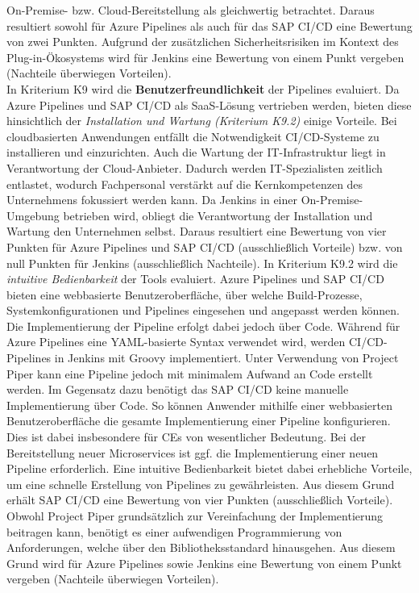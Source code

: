 On-Premise- bzw. Cloud-Bereitstellung als gleichwertig betrachtet. Daraus resultiert sowohl für Azure Pipelines als auch für das SAP CI/CD eine Bewertung von zwei Punkten. Aufgrund der zusätzlichen Sicherheitsrisiken im Kontext des Plug-in-Ökosystems wird für Jenkins eine Bewertung von einem Punkt vergeben (Nachteile überwiegen Vorteilen).\\ In Kriterium K9 wird die \textbf{Benutzerfreundlichkeit} der Pipelines evaluiert. Da Azure Pipelines und SAP CI/CD als SaaS-Lösung vertrieben werden, bieten diese hinsichtlich der \textit{Installation und Wartung (Kriterium K9.2)} einige Vorteile. Bei cloudbasierten Anwendungen entfällt die Notwendigkeit CI/CD-Systeme zu installieren und einzurichten. Auch die Wartung der IT-Infrastruktur liegt in Verantwortung der Cloud-Anbieter. Dadurch werden IT-Spezialisten zeitlich entlastet, wodurch Fachpersonal verstärkt auf die Kernkompetenzen des Unternehmens fokussiert werden kann. Da Jenkins in einer On-Premise-Umgebung betrieben wird, obliegt die Verantwortung der Installation und Wartung den Unternehmen selbst. Daraus resultiert eine Bewertung von vier Punkten für Azure Pipelines und SAP CI/CD (ausschließlich Vorteile) bzw. von null Punkten für Jenkins (ausschließlich Nachteile). In Kriterium K9.2 wird die \textit{intuitive Bedienbarkeit} der Tools evaluiert. Azure Pipelines und SAP CI/CD bieten eine webbasierte Benutzeroberfläche, über welche Build-Prozesse, Systemkonfigurationen und Pipelines eingesehen und angepasst werden können. Die Implementierung der Pipeline erfolgt dabei jedoch über Code. Während für Azure Pipelines eine YAML-basierte Syntax verwendet wird, werden CI/CD-Pipelines in Jenkins mit Groovy implementiert. Unter Verwendung von Project Piper kann eine Pipeline jedoch mit minimalem Aufwand an Code erstellt werden. Im Gegensatz dazu benötigt das SAP CI/CD keine manuelle Implementierung über Code. So können Anwender mithilfe einer webbasierten Benutzeroberfläche die gesamte Implementierung einer Pipeline konfigurieren. Dies ist dabei insbesondere für CEs von wesentlicher Bedeutung. Bei der Bereitstellung neuer Microservices ist ggf. die Implementierung einer neuen Pipeline erforderlich. Eine intuitive Bedienbarkeit bietet dabei erhebliche Vorteile, um eine schnelle Erstellung von Pipelines zu gewährleisten. Aus diesem Grund erhält SAP CI/CD eine Bewertung von vier Punkten (ausschließlich Vorteile). Obwohl Project Piper grundsätzlich zur Vereinfachung der Implementierung beitragen kann, benötigt es einer aufwendigen Programmierung von Anforderungen, welche über den Bibliotheksstandard hinausgehen. Aus diesem Grund wird für Azure Pipelines sowie Jenkins eine Bewertung von einem Punkt vergeben (Nachteile überwiegen Vorteilen).
